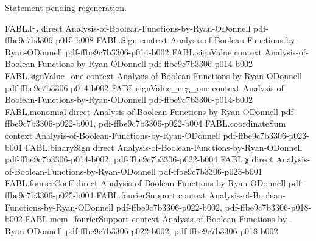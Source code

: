 \begin{theorem}
\label{FABL.subsetDensity_apply}
\leanok
{}
Statement pending regeneration.
\end{theorem}

\begin{theorem}
\label{FABL.binaryFourierCoeff_subsetDensity_singleton_zero}
\leanok
{}
\proofstep
  {FABL.𝔽₂}
  {direct}
  {Analysis-of-Boolean-Functions-by-Ryan-ODonnell}
  {pdf-ffbe9c7b3306-p015-b008}
\proofstep
  {FABL.Sign}
  {context}
  {Analysis-of-Boolean-Functions-by-Ryan-ODonnell}
  {pdf-ffbe9c7b3306-p014-b002}
\proofstep
  {FABL.signValue}
  {context}
  {Analysis-of-Boolean-Functions-by-Ryan-ODonnell}
  {pdf-ffbe9c7b3306-p014-b002}
\proofstep
  {FABL.signValue_one}
  {context}
  {Analysis-of-Boolean-Functions-by-Ryan-ODonnell}
  {pdf-ffbe9c7b3306-p014-b002}
\proofstep
  {FABL.signValue_neg_one}
  {context}
  {Analysis-of-Boolean-Functions-by-Ryan-ODonnell}
  {pdf-ffbe9c7b3306-p014-b002}
\proofstep
  {FABL.monomial}
  {direct}
  {Analysis-of-Boolean-Functions-by-Ryan-ODonnell}
  {pdf-ffbe9c7b3306-p022-b001,
    pdf-ffbe9c7b3306-p022-b004}
\proofstep
  {FABL.coordinateSum}
  {context}
  {Analysis-of-Boolean-Functions-by-Ryan-ODonnell}
  {pdf-ffbe9c7b3306-p023-b001}
\proofstep
  {FABL.binarySign}
  {direct}
  {Analysis-of-Boolean-Functions-by-Ryan-ODonnell}
  {pdf-ffbe9c7b3306-p014-b002,
    pdf-ffbe9c7b3306-p022-b004}
\proofstep
  {FABL.χ}
  {direct}
  {Analysis-of-Boolean-Functions-by-Ryan-ODonnell}
  {pdf-ffbe9c7b3306-p023-b001}
\proofstep
  {FABL.fourierCoeff}
  {direct}
  {Analysis-of-Boolean-Functions-by-Ryan-ODonnell}
  {pdf-ffbe9c7b3306-p025-b004}
\proofstep
  {FABL.fourierSupport}
  {context}
  {Analysis-of-Boolean-Functions-by-Ryan-ODonnell}
  {pdf-ffbe9c7b3306-p022-b002,
    pdf-ffbe9c7b3306-p018-b002}
\proofstep
  {FABL.mem_fourierSupport}
  {context}
  {Analysis-of-Boolean-Functions-by-Ryan-ODonnell}
  {pdf-ffbe9c7b3306-p022-b002,
    pdf-ffbe9c7b3306-p018-b002}

\end{theorem}
